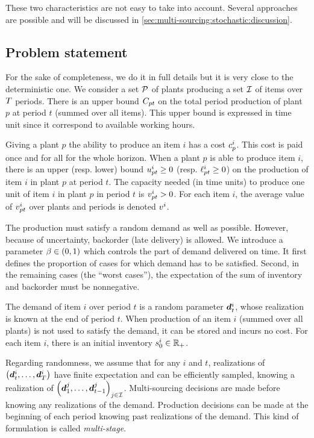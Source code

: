 These two characteristics are not easy to take into account.
Several approaches are possible and will be discussed in \cref{sec:multi-sourcing:stochastic:discussion}.



\subsection{Problem statement}
\label{sec:multi-sourcing:stochastic:introduction:problem-statement}


For the sake of completeness, we do it in full details but it is very close to the deterministic one.
We consider a set $\mathcal{P}$ of plants producing a set $\mathcal{I}$ of items over $T$ periods.
There is an upper bound $C_{pt}$ on the total period production of plant $p$ at period $t$ (summed over all items).
This upper bound is expressed in time unit since it correspond to available working hours.


Giving a plant $p$ the ability to produce an item $i$ has a cost $c_p^i$.
This cost is paid once and for all for the whole horizon.
When a plant $p$ is able to produce item $i$, there is an upper (resp. lower) bound $u_{pt}^i\ge 0$ (resp. $\ell_{pt}^i\ge 0$) on the production of item $i$ in plant $p$ at period $t$.
The capacity needed (in time units) to produce one unit of item $i$ in plant $p$ in period $t$ is $v_{pt}^i>0$.
For each item $i$, the average value of $v_{pt}^i$ over plants and periods is denoted $v^i$.


The production must satisfy a random demand as well as possible.
However, because of uncertainty, backorder (\ie late delivery) is allowed.
We introduce a parameter $\servicelvl\in\bracket{0,1}$ which controls the part of demand delivered on time.
It first defines the proportion of cases for which demand has to be satisfied.
Second, in the remaining cases (\ie the ``worst cases''), the expectation of the sum of inventory and backorder must be nonnegative.


The demand of item $i$ over period $t$ is a random parameter $\va\demand_t^i$, whose realization is known at the end of period $t$.
When production of an item $i$ (summed over all plants) is not used to satisfy the demand, it can be stored and incurs no cost.
For each item $i$, there is an initial inventory $s_0^i\in\mathbb{R}_+$.


Regarding randomness, we assume that for any $i$ and $t$, realizations of $\bracket{\va\demand_t^i,\ldots,\va\demand_{\horizon}^i}$ have finite expectation and can be efficiently sampled, knowing a realization of $\bracket{\va\demand_1^j,\ldots,\va\demand_{t-1}^j}_{j\in\REF}$.
Multi-sourcing decisions are made before knowing any realizations of the demand.
Production decisions can be made at the beginning of each period knowing past realizations of the demand.
This kind of formulation is called \emph{multi-stage}.


